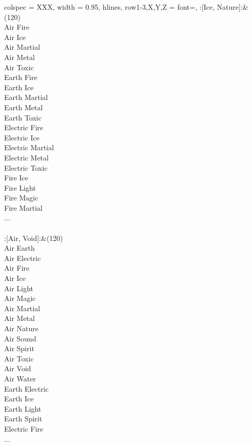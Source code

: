 \begin{longtblr}[
	caption = {2v2 Defending Weak},
	label = {2v2-Defending-Weak},
]{
	colspec = {XXX}, width = 0.95\linewidth,
	hlines,
	row{1-3,X,Y,Z} = {font=\bfseries},
}
	:[Ice, Nature]:&{(120)\\
	Air Fire \\
	Air Ice \\
	Air Martial \\
	Air Metal \\
	Air Toxic \\
	Earth Fire \\
	Earth Ice \\
	Earth Martial \\
	Earth Metal \\
	Earth Toxic \\
	Electric Fire \\
	Electric Ice \\
	Electric Martial \\
	Electric Metal \\
	Electric Toxic \\
	Fire Ice \\
	Fire Light \\
	Fire Magic \\
	Fire Martial \\
	...\\
	}\\

	:[Air, Void]:&{(120)\\
	Air Earth \\
	Air Electric \\
	Air Fire \\
	Air Ice \\
	Air Light \\
	Air Magic \\
	Air Martial \\
	Air Metal \\
	Air Nature \\
	Air Sound \\
	Air Spirit \\
	Air Toxic \\
	Air Void \\
	Air Water \\
	Earth Electric \\
	Earth Ice \\
	Earth Light \\
	Earth Spirit \\
	Electric Fire \\
	...\\
	}\\


\end{longtblr}
